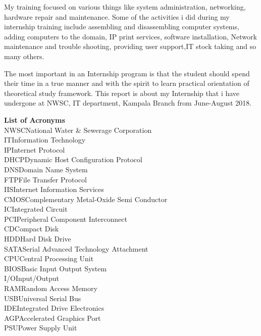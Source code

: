 \documentclass{article}
\begin{document}
\par My training focused on various things like system administration, networking, hardware repair and maintenance. Some of the activities i did during my internship training include assembling and disassembling computer systems, adding computers to the domain, IP print services, software installation, Network maintenance and trouble shooting, providing user support,IT stock taking  and so many others.
\par The most important in an Internship program is that the student should spend their time in a true manner and with the spirit to learn practical orientation of theoretical study framework. This report is about my Internship that i have undergone at NWSC, IT department, Kampala Branch from June-August 2018.
\thispagestyle{empty}
\newpage
{}
\tableofcontents
\clearpage
\newpage
\listoffigures
\newpage
\listoftables
\newpage
\textbf{List of Acronyms}\\
NWSC\dotfill  National Water \& Sewerage Corporation\\
IT\dotfill Information Technology\\
IP\dotfill Internet Protocol\\
DHCP\dotfill Dynamic Host Configuration Protocol\\
DNS\dotfill Domain Name System\\
FTP\dotfill File Transfer Protocol\\
IIS\dotfill Internet Information Services\\
CMOS\dotfill Complementary Metal-Oxide Semi Conductor\\
IC\dotfill Integrated Circuit\\
PCI\dotfill Peripheral Component Interconnect\\
CD\dotfill Compact Disk\\
HDD\dotfill Hard Disk Drive\\
SATA\dotfill Serial Advanced Technology Attachment\\
CPU\dotfill Central Processing Unit\\
BIOS\dotfill Basic Input Output System\\
I/O\dotfill Input/Output\\
RAM\dotfill Random Access Memory\\
USB\dotfill Universal Serial Bus\\
IDE\dotfill Integrated Drive Electronics\\
AGP\dotfill Accelerated Graphics Port\\
PSU\dotfill Power Supply Unit\\
\end{document}
